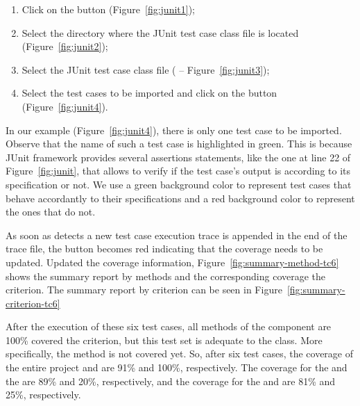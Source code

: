 \begin{enumerate}
    \item Click on the  button
    (Figure~\ref{fig:junit1});

    \item Select the directory where the JUnit test case class file is located
    (Figure~\ref{fig:junit2});

    \item Select the JUnit test case class file (
    -- Figure~\ref{fig:junit3});

    \item Select the test cases to be imported and click on the
     button (Figure~\ref{fig:junit4}).
\end{enumerate}



In our example (Figure~\ref{fig:junit4}), there is only one test
case to be imported. Observe that the name of such a test case
 is highlighted in green. This is
because JUnit framework provides several assertions statements,
like the one at line 22 of Figure~\ref{fig:junit}, that allows to
verify if the test case's output is according to its specification
or not. We use a green background color to represent test cases
that behave accordantly to their specifications and a red
background color to represent the ones that do not.

As soon as \toolname detects a new test case execution trace is
appended in the end of the trace file, the  button
becomes red indicating that the coverage needs to be updated.
Updated the coverage information,
Figure~\ref{fig:summary-method-tc6} shows the summary report by
methods and the corresponding coverage \wrt the 
criterion. The summary report by criterion can be seen in
Figure~\ref{fig:summary-criterion-tc6}





After the execution of these six test cases, all methods of the
 component are 100\% covered \wrt the
 criterion, but this test set is adequate to the
 class. More specifically, the
 method is not covered yet. So,
after six test cases, the coverage of the entire project \wrt
{} and  are 91\% and 100\%,
respectively. The coverage for the  and the
 are 89\% and 20\%, respectively, and the
coverage for the  and  are 81\%
and 25\%, respectively.

